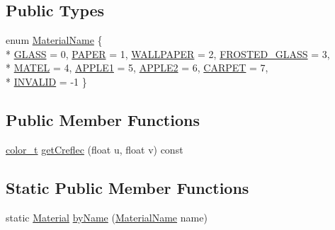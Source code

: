 \subsection*{Public Types}
\begin{DoxyCompactItemize}
\item 
enum \hyperlink{structMaterial_afca902ab9d34ae538cf8eb74afe51911}{Material\+Name} \{ \\*
\hyperlink{structMaterial_afca902ab9d34ae538cf8eb74afe51911aafad09ef73f6aaa26e1dc8bee89871f4}{G\+L\+A\+SS} = 0, 
\hyperlink{structMaterial_afca902ab9d34ae538cf8eb74afe51911aa2ff05704fdd8947102f11cc6b900524}{P\+A\+P\+ER} = 1, 
\hyperlink{structMaterial_afca902ab9d34ae538cf8eb74afe51911adf626c4a22b6e4ebaf71c865f3745511}{W\+A\+L\+L\+P\+A\+P\+ER} = 2, 
\hyperlink{structMaterial_afca902ab9d34ae538cf8eb74afe51911a2589b47b8d5b8e31f37f5cfa05eba139}{F\+R\+O\+S\+T\+E\+D\+\_\+\+G\+L\+A\+SS} = 3, 
\\*
\hyperlink{structMaterial_afca902ab9d34ae538cf8eb74afe51911aa6a166ca282ccb460f6d6f15ba84330c}{M\+A\+T\+EL} = 4, 
\hyperlink{structMaterial_afca902ab9d34ae538cf8eb74afe51911ab6c2ef78c1a421123d7e28eedc85537e}{A\+P\+P\+L\+E1} = 5, 
\hyperlink{structMaterial_afca902ab9d34ae538cf8eb74afe51911a776beb5fcd46544f77f4295e757a66e5}{A\+P\+P\+L\+E2} = 6, 
\hyperlink{structMaterial_afca902ab9d34ae538cf8eb74afe51911a0af45e90f770ebcd117f33e9a902ea21}{C\+A\+R\+P\+ET} = 7, 
\\*
\hyperlink{structMaterial_afca902ab9d34ae538cf8eb74afe51911ac7607d77ae775a5b04874bda2cb82a2e}{I\+N\+V\+A\+L\+ID} = -\/1
 \}
\end{DoxyCompactItemize}
\subsection*{Public Member Functions}
\begin{DoxyCompactItemize}
\item 
\hyperlink{ray_8h_a8a2580fb65f7d3d4e24bdd412b9bd92d}{color\+\_\+t} \hyperlink{structMaterial_a4ab05a2f4f22025aee4c5087a3517d48}{get\+Creflec} (float u, float v) const 
\end{DoxyCompactItemize}
\subsection*{Static Public Member Functions}
\begin{DoxyCompactItemize}
\item 
static \hyperlink{structMaterial}{Material} \hyperlink{structMaterial_ad488bda0cf014154f97bce06b1c3be29}{by\+Name} (\hyperlink{structMaterial_afca902ab9d34ae538cf8eb74afe51911}{Material\+Name} name)
\end{DoxyCompactItemize}
